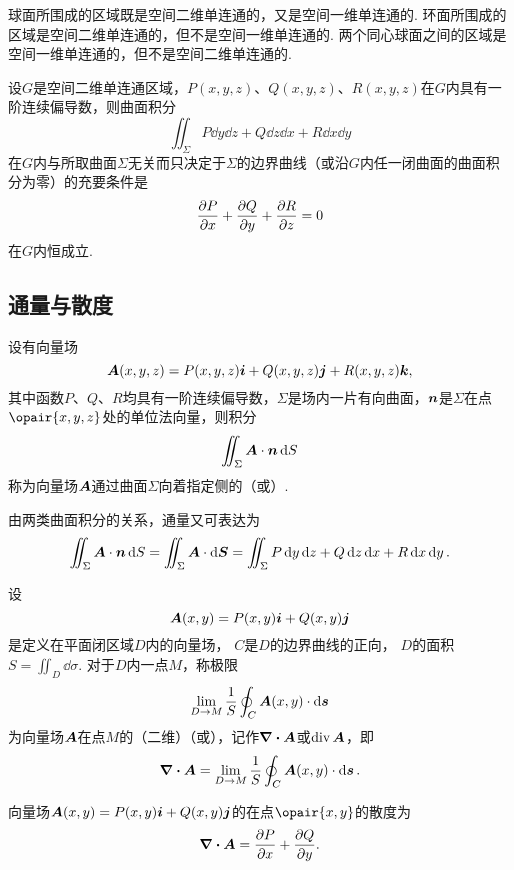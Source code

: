 \begin{example}
球面所围成的区域既是空间二维单连通的，又是空间一维单连通的.
环面所围成的区域是空间二维单连通的，但不是空间一维单连通的.
两个同心球面之间的区域是空间一维单连通的，但不是空间二维单连通的.
\end{example}

\begin{theorem}\label{theorem:线积分与面积分.沿任意闭曲面的曲面积分为零的条件}
设\(G\)是空间二维单连通区域，\(P(x,y,z)\)、\(Q(x,y,z)\)、\(R(x,y,z)\)在\(G\)内具有一阶连续偏导数，则曲面积分\[
\iint_{\Sigma} P\dd{y}\dd{z}+Q\dd{z}\dd{x}+R\dd{x}\dd{y}
\]在\(G\)内与所取曲面\(\Sigma\)无关而只决定于\(\Sigma\)的边界曲线（或沿\(G\)内任一闭曲面的曲面积分为零）的充要条件是\[
\pdv{P}{x}+\pdv{Q}{y}+\pdv{R}{z} = 0
\]在\(G\)内恒成立.
\end{theorem}

\subsection{通量与散度}
\begin{definition}
设有向量场\[
\boldsymbol{A}(x,y,z)=P(x,y,z)\boldsymbol{i}+Q(x,y,z)\boldsymbol{j}+R(x,y,z)\boldsymbol{k},
\]其中函数\(P\)、\(Q\)、\(R\)均具有一阶连续偏导数，\(\Sigma\)是场内一片有向曲面，\(\boldsymbol{n}\)是\(\Sigma\)在点\(\opair{x,y,z}\)处的单位法向量，则积分\[
\iint_{\Sigma}{\boldsymbol{A}\cdot\boldsymbol{n}\dd{S}}
\]称为向量场\(\boldsymbol{A}\)通过曲面\(\Sigma\)向着指定侧的（或）.
\end{definition}
由两类曲面积分的关系，通量又可表达为\[
\iint_{\Sigma} \boldsymbol{A}\cdot\boldsymbol{n}\dd{S}
=\iint_{\Sigma} \boldsymbol{A}\cdot\dd{\boldsymbol{S}}
=\iint_{\Sigma} P\dd{y}\dd{z}+Q\dd{z}\dd{x}+R\dd{x}\dd{y}.
\]

\begin{definition}[平面上的散度]
\def\defofdiv{\lim\limits_{D \to M} \frac{1}{S} \oint_C \mat{A}(x,y) \cdot \dd{\mat{s}}}%
设\[
\boldsymbol{A}(x,y)=P(x,y)\boldsymbol{i}+Q(x,y)\boldsymbol{j}
\]是定义在平面闭区域\(D\)内的向量场，%
\(C\)是\(D\)的边界曲线的正向，%
\(D\)的面积\(S = \iint_{D} \dd{\sigma}\).
对于\(D\)内一点\(M\)，称极限\[
\defofdiv
\]为向量场\(\boldsymbol{A}\)在点\(M\)的（二维）（或），记作\(\div{\boldsymbol{A}}\)或\(\operatorname{div}\boldsymbol{A}\)，即\[
\div{\mat{A}} = \defofdiv.
\]
\end{definition}

\begin{theorem}
向量场\(\boldsymbol{A}(x,y)=P(x,y)\boldsymbol{i}+Q(x,y)\boldsymbol{j}\)的在点\(\opair{x,y}\)的散度为\[
\div{\boldsymbol{A}} = \pdv{P}{x}+\pdv{Q}{y}.
\]
\end{theorem}

